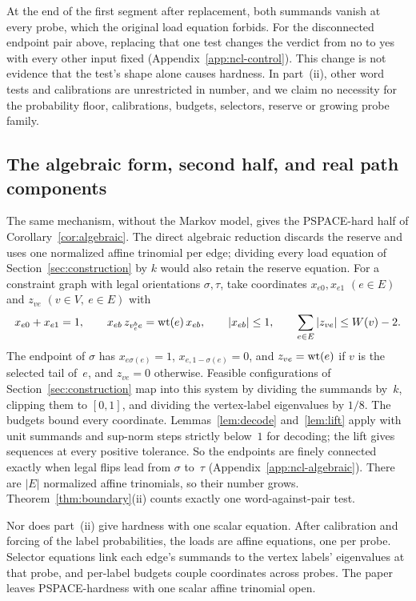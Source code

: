 At the end of the first segment after replacement, both summands vanish at
every probe, which the original load equation forbids. For the disconnected
endpoint pair above, replacing that one test changes the verdict from no
to yes with every other input fixed (Appendix~\ref{app:ncl-control}). This change is not evidence that the test's shape
alone causes hardness. In part~(ii), other word tests and calibrations are
unrestricted in number, and we claim no necessity for the probability
floor, calibrations, budgets, selectors, reserve or growing probe family.

\subsection{The algebraic form, second half, and real path components}\label{sec:real-ncl}

The same mechanism, without the Markov model, gives the PSPACE-hard half
of Corollary~\ref{cor:algebraic}. The direct algebraic reduction discards
the reserve and uses one normalized affine trinomial per edge; dividing every load
equation of Section~\ref{sec:construction} by $k$ would also retain the
reserve equation. For a
constraint graph with legal orientations $\sigma,\tau$, take coordinates
$x_{e0},x_{e1}$ $(e\in E)$ and $z_{ve}$ $(v\in V,\ e\in E)$ with
\begin{equation}\label{eq:ncl-system}
  x_{e0}+x_{e1}=1,\qquad
  x_{eb}\,z_{v_e^be}=\operatorname{wt}(e)\,x_{eb},\qquad
  |x_{eb}|\le1,\qquad
  \sum_{e\in E}|z_{ve}|\le W(v)-2.
\end{equation}
The endpoint of $\sigma$ has $x_{e\sigma(e)}=1$, $x_{e,1-\sigma(e)}=0$, and
$z_{ve}=\operatorname{wt}(e)$ if $v$ is the selected tail of~$e$, and $z_{ve}=0$
otherwise. Feasible configurations of Section~\ref{sec:construction} map
into this system by dividing the summands by~$k$, clipping them to $[0,1]$, and
dividing the vertex-label eigenvalues by $1/8$. The budgets bound every coordinate.
Lemmas~\ref{lem:decode} and~\ref{lem:lift} apply with unit
summands and sup-norm steps strictly below~$1$ for decoding; the lift gives
sequences at every positive tolerance. So the endpoints are finely
connected exactly when legal flips lead from $\sigma$ to~$\tau$
(Appendix~\ref{app:ncl-algebraic}). There are $|E|$ normalized affine
trinomials, so their number grows. Theorem~\ref{thm:boundary}(ii) counts
exactly one word-against-pair test.

Nor does part~(ii) give hardness with one scalar equation. After
calibration and forcing of the label probabilities, the loads are affine
equations, one per probe. Selector equations link each edge's summands to
the vertex labels' eigenvalues at that probe, and per-label budgets couple
coordinates across probes. The paper leaves PSPACE-hardness with one
scalar affine trinomial open.

